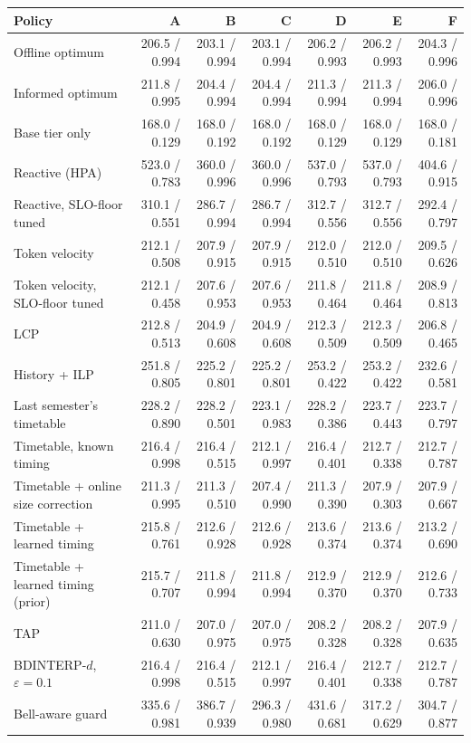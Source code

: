 \begin{tabular}{@{}lrrrrrr@{}}
\toprule
Policy & A & B & C & D & E & F \\
\midrule
Offline optimum & 206.5 / 0.994 & 203.1 / 0.994 & 203.1 / 0.994 & 206.2 / 0.993 & 206.2 / 0.993 & 204.3 / 0.996 \\
Informed optimum & 211.8 / 0.995 & 204.4 / 0.994 & 204.4 / 0.994 & 211.3 / 0.994 & 211.3 / 0.994 & 206.0 / 0.996 \\
Base tier only & 168.0 / 0.129 & 168.0 / 0.192 & 168.0 / 0.192 & 168.0 / 0.129 & 168.0 / 0.129 & 168.0 / 0.181 \\
Reactive (HPA) & 523.0 / 0.783 & 360.0 / 0.996 & 360.0 / 0.996 & 537.0 / 0.793 & 537.0 / 0.793 & 404.6 / 0.915 \\
Reactive, SLO-floor tuned & 310.1 / 0.551 & 286.7 / 0.994 & 286.7 / 0.994 & 312.7 / 0.556 & 312.7 / 0.556 & 292.4 / 0.797 \\
Token velocity & 212.1 / 0.508 & 207.9 / 0.915 & 207.9 / 0.915 & 212.0 / 0.510 & 212.0 / 0.510 & 209.5 / 0.626 \\
Token velocity, SLO-floor tuned & 212.1 / 0.458 & 207.6 / 0.953 & 207.6 / 0.953 & 211.8 / 0.464 & 211.8 / 0.464 & 208.9 / 0.813 \\
LCP & 212.8 / 0.513 & 204.9 / 0.608 & 204.9 / 0.608 & 212.3 / 0.509 & 212.3 / 0.509 & 206.8 / 0.465 \\
History + ILP & 251.8 / 0.805 & 225.2 / 0.801 & 225.2 / 0.801 & 253.2 / 0.422 & 253.2 / 0.422 & 232.6 / 0.581 \\
Last semester's timetable & 228.2 / 0.890 & 228.2 / 0.501 & 223.1 / 0.983 & 228.2 / 0.386 & 223.7 / 0.443 & 223.7 / 0.797 \\
Timetable, known timing & 216.4 / 0.998 & 216.4 / 0.515 & 212.1 / 0.997 & 216.4 / 0.401 & 212.7 / 0.338 & 212.7 / 0.787 \\
Timetable + online size correction & 211.3 / 0.995 & 211.3 / 0.510 & 207.4 / 0.990 & 211.3 / 0.390 & 207.9 / 0.303 & 207.9 / 0.667 \\
Timetable + learned timing & 215.8 / 0.761 & 212.6 / 0.928 & 212.6 / 0.928 & 213.6 / 0.374 & 213.6 / 0.374 & 213.2 / 0.690 \\
Timetable + learned timing (prior) & 215.7 / 0.707 & 211.8 / 0.994 & 211.8 / 0.994 & 212.9 / 0.370 & 212.9 / 0.370 & 212.6 / 0.733 \\
TAP & 211.0 / 0.630 & 207.0 / 0.975 & 207.0 / 0.975 & 208.2 / 0.328 & 208.2 / 0.328 & 207.9 / 0.635 \\
BDINTERP-$d$, $\varepsilon=0.1$ & 216.4 / 0.998 & 216.4 / 0.515 & 212.1 / 0.997 & 216.4 / 0.401 & 212.7 / 0.338 & 212.7 / 0.787 \\
Bell-aware guard & 335.6 / 0.981 & 386.7 / 0.939 & 296.3 / 0.980 & 431.6 / 0.681 & 317.2 / 0.629 & 304.7 / 0.877 \\
\bottomrule
\end{tabular}
